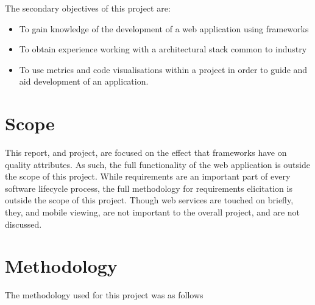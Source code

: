 The secondary objectives of this project are: 

\begin{itemize}
\item To gain knowledge of the development of a web application using frameworks
\item To obtain experience working with a architectural stack common to industry
\item To use metrics and code visualisations within a project in order to guide and aid development of an application.
\end{itemize}

\section{Scope}

This report, and project, are focused on the effect that frameworks have on quality attributes. As such, the full functionality of the web application is outside the scope of this project. While requirements are an important part of every software lifecycle process, the full methodology for requirements elicitation is outside the scope of this project. Though web services are touched on briefly, they, and mobile viewing, are not important to the overall project, and are not discussed. 

\section{Methodology}

The methodology used for this project was as follows

